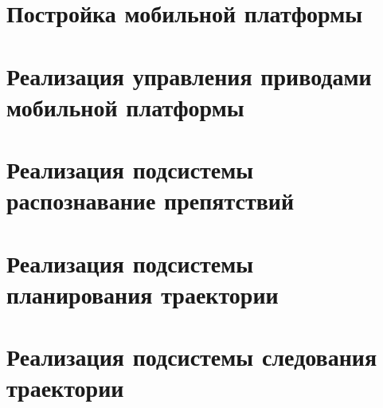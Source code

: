 \section{Постройка мобильной платформы}


\section{Реализация управления приводами мобильной платформы}
\section{Реализация подсистемы распознавание препятствий}
\section{Реализация подсистемы планирования траектории}
\section{Реализация подсистемы следования траектории}